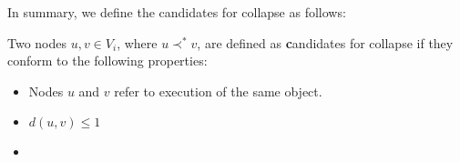 In summary, we define the candidates for collapse as follows:
\begin{definition}
Two nodes $u, v \in V_i$, where ${u \prec^{*} v}$, are defined as {\textbf candidates for collapse} if they conform to the following properties:
\begin{itemize}
 \item Nodes ${u}$ and ${v}$ refer to execution of the same object.
  \item $d(u, v) \le 1$
  \item {}
\end{itemize}
\end{definition}

